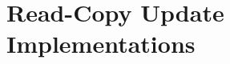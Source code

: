 
\chapter{Read-Copy Update Implementations}
\label{app:rcuimpl:Read-Copy Update Implementations}


% 
% 
% 

% 
